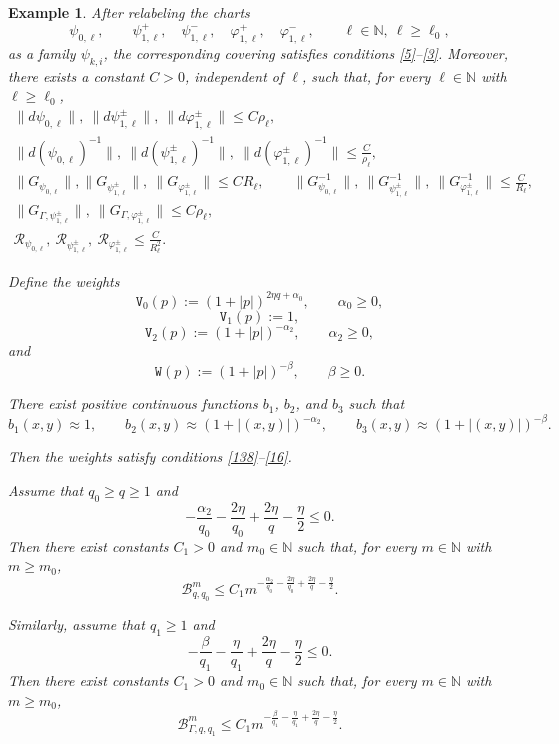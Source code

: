 \documentclass[reqno, 11pt, a4paper]{amsart}
\newtheorem{example}[theorem]{Example}
\numberwithin{equation}{section}
\newcommand{\wghtv}{\mathtt{V}}
\newcommand{\wghtw}{\mathtt{W}}
\newcommand{\kp}{\mathscr{R}}
\newcommand{\qxp}{q}
\newcommand{\bnorm}{\boldsymbol{\|}}
\newcommand{\N}{\mathbb{N}}
\begin{document}
\begin{example}
After relabeling the charts
\[
\psi_{0,\ell},
\qquad
\psi_{1,\ell}^{+},
\quad
\psi_{1,\ell}^{-},
\quad
\varphi_{1,\ell}^{+},
\quad
\varphi_{1,\ell}^{-},
\qquad
\ell\in\N,\ \ell\geq\ell_0,
\]
as a family $\psi_{k,i}$, the corresponding covering satisfies conditions
\ref{5}--\ref{3}. Moreover, there exists a constant $C>0$, independent of
$\ell$, such that, for every $\ell\in\N$ with $\ell\geq\ell_0$,
\begin{gather*}
\bnorm d\psi_{0,\ell}\bnorm, \
\bnorm d\psi_{1,\ell}^{\pm}\bnorm,  \
\bnorm d\varphi_{1,\ell}^{\pm}\bnorm
\leq
C\rho_\ell,
\label{eq:dpsi-shrinking-components-eta}
\\[3pt]
\bnorm d(\psi_{0,\ell})^{-1}\bnorm, \
\bnorm d(\psi_{1,\ell}^{\pm})^{-1}\bnorm, \
\bnorm d(\varphi_{1,\ell}^{\pm})^{-1}\bnorm
\leq
\frac{C}{\rho_\ell},
\label{eq:inverse-dpsi-shrinking-components-eta}
\\[3pt]
\bnorm G_{\psi_{0,\ell}}\bnorm,
\bnorm G_{\psi_{1,\ell}^{\pm}}\bnorm, \
\bnorm G_{\varphi_{1,\ell}^{\pm}}\bnorm
\leq
CR_\ell, 
\qquad
\bnorm G_{\psi_{0,\ell}}^{-1}\bnorm, \
\bnorm G_{\psi_{1,\ell}^{\pm}}^{-1}\bnorm, \
\bnorm G_{\varphi_{1,\ell}^{\pm}}^{-1}\bnorm
\leq
\frac{C}{R_\ell},
\label{eq:G-shrinking-components-eta}
\\[3pt]
\bnorm G_{\Gamma,\psi_{1,\ell}^{\pm}}\bnorm, \
\bnorm G_{\Gamma,\varphi_{1,\ell}^{\pm}}\bnorm
\leq
C\rho_\ell, 
\label{eq:Gamma-G-shrinking-components-eta}\\[3pt]
\kp_{\psi_{0,\ell}}, \
\kp_{\psi_{1,\ell}^{\pm}}, \
\kp_{\varphi_{1,\ell}^{\pm}}
\leq
\frac{C}{R_\ell^2} .
\label{eq:kappa-shrinking-components-eta}
\end{gather*}

Define the weights
\[
\wghtv_0(p)
:=
(1+|p|)^{2\eta\qxp+\alpha_0},
\qquad
\alpha_0\geq0,
\]
\[
\wghtv_1(p):=1,
\]
\[
\wghtv_2(p)
:=
(1+|p|)^{-\alpha_2},
\qquad
\alpha_2\geq0,
\]
and
\[
\wghtw(p)
:=
(1+|p|)^{-\beta},
\qquad
\beta\geq0.
\]

There exist positive continuous functions $b_1$, $b_2$, and $b_3$ such that
\[
b_1(x,y)\approx1,
\qquad
b_2(x,y)\approx(1+|(x,y)|)^{-\alpha_2},
\qquad
b_3(x,y)\approx(1+|(x,y)|)^{-\beta}.
\]

Then the weights satisfy conditions \ref{138}--\ref{16}.

Assume that \(\qxp_0\geq\qxp\geq1\) and
\[
-\frac{\alpha_2}{\qxp_0}
-\frac{2\eta}{\qxp_0}
+\frac{2\eta}{\qxp}
-\frac{\eta}{2}
\leq0.
\]
Then there exist constants \(C_1>0\) and \(m_0\in\N\) such that, for every \(m\in\N\) with \(m\geq m_0\),
\[
\mathcal{B}_{\qxp,\qxp_0}^m
\leq
C_1
m^{
-\frac{\alpha_2}{\qxp_0}
-\frac{2\eta}{\qxp_0}
+\frac{2\eta}{\qxp}
-\frac{\eta}{2}
}.
\]


Similarly, assume that $\qxp_1\geq1$ and
\[
-\frac{\beta}{\qxp_1}
-\frac{\eta}{\qxp_1}
+\frac{2\eta}{\qxp}
-\frac{\eta}{2}
\leq0.
\]
Then there exist constants $C_1>0$ and $m_0\in\N$ such that, for every
$m\in\N$ with $m\geq m_0$,
\[
\mathcal{B}_{\Gamma,\qxp,\qxp_1}^m
\leq
C_1
m^{
-\frac{\beta}{\qxp_1}
-\frac{\eta}{\qxp_1}
+\frac{2\eta}{\qxp}
-\frac{\eta}{2}
}.
\]

\end{example}
\end{document}
